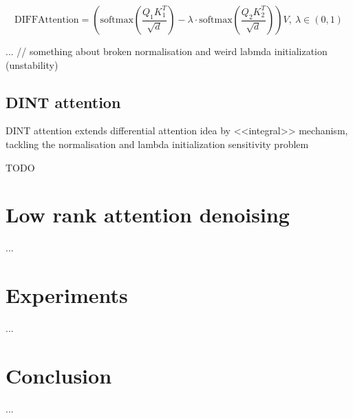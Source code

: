 \documentclass{article}
\begin{document}
    $$\text{DIFFAttention} = \left(\text{softmax}\left(\frac{Q_1 K_1^T}{\sqrt{d}}\right) - \lambda\cdot \text{softmax}\left(\frac{Q_2 K_2^T}{\sqrt{d}}\right)\right)V, ~ \lambda \in (0,1) $$

    ... // something about broken normalisation and weird labmda initialization (unstability) 
    
\subsection{DINT attention}
    DINT attention \cite{cang2025dinttransformer} extends differential attention idea by <<integral>> mechanism, tackling the normalisation and lambda initialization sensitivity problem

    TODO
    

\section{Low rank attention denoising}

    ...

\section{Experiments}
    ... 
\section{Conclusion}

    ...





\end{document}
